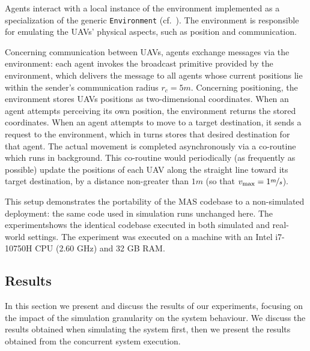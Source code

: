 Agents interact with a local instance of the environment
implemented as a specialization of the generic \jakta{} \texttt{Environment}
(cf.~).
%
The environment is responsible for emulating the \acp{UAV}' physical aspects,
such as position and communication.

Concerning communication between \acp{UAV},
agents exchange messages via the environment:
each agent invokes the broadcast primitive provided by the environment,
which delivers the message to all agents whose current
positions lie within the sender's communication radius $r_c=5m$.
%
Concerning positioning,
the environment stores \acp{UAV} positions as two-dimensional coordinates.
%
When an agent attempts perceiving its own position,
the environment returns the stored coordinates.
%
When an agent attempts to move to a target destination,
it sends a request to the environment,
which in turns stores that desired destination for that agent.
%
The actual movement is completed asynchronously via a co-routine which runs in background.
%
This co-routine would periodically (as frequently as possible) update the positions of each \ac{UAV}
along the straight line toward its target destination,
by a distance non-greater than $1m$
(so that $v_{\max}=1\nicefrac{m}{s}$).

This setup demonstrates the portability of the \ac{MAS}
codebase to a non-simulated deployment:
the same code used in simulation runs unchanged here.
%
The experiment\footnotemark[\value{footnote}]
shows the identical codebase executed in both simulated and real-world settings.
%
%
The experiment was executed on a machine with an Intel i7-10750H CPU (2.60 GHz) and 32 GB RAM\@.

%

\subsection{Results}
\label{ssec:results}

In this section we present and discuss the results of our experiments,
focusing on the impact of the simulation granularity on the system behaviour.
%
We discuss the results obtained when simulating the system first,
then we present the results obtained from the concurrent system execution.

